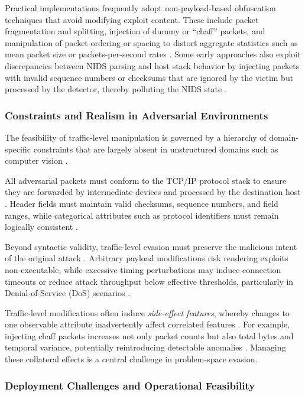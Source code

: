 Practical implementations frequently adopt non-payload-based obfuscation techniques that avoid modifying exploit content. 
These include packet fragmentation and splitting, injection of dummy or ``chaff'' packets, and manipulation of packet ordering or spacing to distort aggregate statistics such as mean packet size or packets-per-second rates \cite{vitorino2023sok}. 
Some early approaches also exploit discrepancies between NIDS parsing and host stack behavior by injecting packets with invalid sequence numbers or checksums that are ignored by the victim but processed by the detector, thereby polluting the NIDS state \cite{hashemi2020enhancing}.

\subsubsection{Constraints and Realism in Adversarial Environments}

The feasibility of traffic-level manipulation is governed by a hierarchy of domain-specific constraints that are largely absent in unstructured domains such as computer vision \cite{vitorino2023sok, wang2024progen}. 

All adversarial packets must conform to the TCP/IP protocol stack to ensure they are forwarded by intermediate devices and processed by the destination host \cite{wang2023evasion}. 
Header fields must maintain valid checksums, sequence numbers, and field ranges, while categorical attributes such as protocol identifiers must remain logically consistent \cite{debicha2023adv}.

Beyond syntactic validity, traffic-level evasion must preserve the malicious intent of the original attack \cite{he2023adversarial}. 
Arbitrary payload modifications risk rendering exploits non-executable, while excessive timing perturbations may induce connection timeouts or reduce attack throughput below effective thresholds, particularly in Denial-of-Service (DoS) scenarios \cite{han2021evaluating, liu2025hard}.

Traffic-level modifications often induce \emph{side-effect features}, whereby changes to one observable attribute inadvertently affect correlated features \cite{vitorino2023sok}. 
For example, injecting chaff packets increases not only packet counts but also total bytes and temporal variance, potentially reintroducing detectable anomalies \cite{vitorino2023sok}. 
Managing these collateral effects is a central challenge in problem-space evasion.

\subsubsection{Deployment Challenges and Operational Feasibility}

